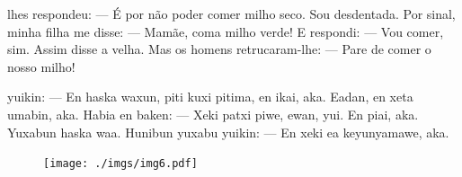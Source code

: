 
 lhes respondeu:\break
--- É por não poder comer milho
seco. Sou desdentada. Por
sinal, minha filha me disse:\break
--- Mamãe, coma milho verde!\break
E respondi:\break
--- Vou comer, sim.
Assim disse a velha. Mas os
homens retrucaram-lhe:\break
--- Pare de comer o nosso milho!

\vspace{2em}

 yuikin:\break
--- En haska waxun, piti kuxi
pitima, en ikai, aka. Eadan,
en xeta umabin, aka.
Habia en baken:\break
--- Xeki patxi piwe, ewan,
yui.\break
En piai, aka. Yuxabun haska waa.
Hunibun yuxabu yuikin:\break
--- En xeki ea keyunyamawe, aka.

\vspace*{\fill}

\pagebreak
\thispagestyle{empty}
\begin{figure}
\vspace*{-.5cm}
\hspace*{-2.2cm}\texttt{[image: ./imgs/img6.pdf]}
\end{figure}

\chapter*{}

\mbox{}\vspace*{\fill}


